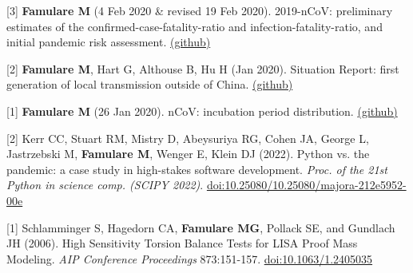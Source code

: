 \documentclass{article}
\begin{document}
\begin{llist}
\begin{items}
	\item[{[3]}]
	\textbf{Famulare M} (4 Feb 2020 \& revised 19 Feb 2020). 2019-nCoV: preliminary estimates of the confirmed-case-fatality-ratio and infection-fatality-ratio, and initial pandemic risk assessment. \href{https://institutefordiseasemodeling.github.io/COVID-public/analyses/first_adjusted_mortality_estimates_and_risk_assessment/2019-nCoV-preliminary_age_and_time_adjusted_mortality_rates_and_pandemic_risk_assessment.html}{(github)}
	
	\item[{[2]}] \textbf{Famulare M}, Hart G, Althouse B, Hu H (Jan 2020). Situation Report: first generation of local transmission outside of China. \href{https://institutefordiseasemodeling.github.io/COVID-public/analyses/sitRep_local_transmission_outside_China/sitRep_local_transmission_outside_China.html}{(github)}
	
	\item[{[1]}] \textbf{Famulare M} (26 Jan 2020). nCoV: incubation period distribution. \href{https://institutefordiseasemodeling.github.io/COVID-public/analyses/individual_dynamics_estimates/nCoV_incubation_period.html}{(github)} \
	
\end{items}


 \vspace{4pt}
 \begin{items}
 	\item[{[2]}] Kerr CC, Stuart RM, Mistry D, Abeysuriya RG, Cohen JA, George L, Jastrzebski M, \textbf{Famulare M}, Wenger E, Klein DJ (2022). Python vs. the pandemic: a case study in high-stakes software development. \emph{Proc. of the 21st Python in science comp. (SCIPY 2022)}. \href{https://doi.org/10.25080/majora-212e5952-00e}{doi:10.25080/10.25080/majora-212e5952-00e}
 	
  \item[{[1]}] Schlamminger S, Hagedorn CA, \textbf{Famulare MG}, Pollack SE, and Gundlach JH (2006). High Sensitivity Torsion Balance Tests for LISA Proof Mass Modeling. \emph{AIP Conference Proceedings} 873:151-157.  \href{https://doi.org/10.1063/1.2405035}{doi:10.1063/1.2405035} \\

\end{items}

\vspace{4pt}


\end{llist}
\end{document}
